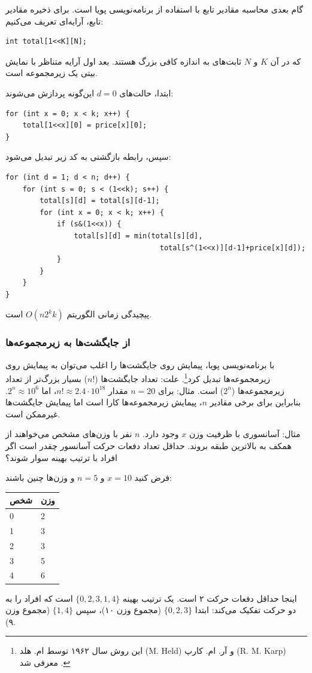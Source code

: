 گام بعدی محاسبه مقادیر تابع با استفاده از برنامه‌نویسی پویا است.
برای ذخیره مقادیر تابع، آرایه‌ای تعریف می‌کنیم:
\begin{lstlisting}
int total[1<<K][N];
\end{lstlisting}
که در آن $K$ و $N$ ثابت‌های به اندازه کافی بزرگ هستند.
بعد اول آرایه متناظر با نمایش بیتی یک زیرمجموعه است.

ابتدا، حالت‌های $d=0$ این‌گونه پردازش می‌شوند:
\begin{lstlisting}
for (int x = 0; x < k; x++) {
    total[1<<x][0] = price[x][0];
}
\end{lstlisting}
سپس، رابطه بازگشتی به کد زیر تبدیل می‌شود:
\begin{lstlisting}
for (int d = 1; d < n; d++) {
    for (int s = 0; s < (1<<k); s++) {
        total[s][d] = total[s][d-1];
        for (int x = 0; x < k; x++) {
            if (s&(1<<x)) {
                total[s][d] = min(total[s][d],
                                    total[s^(1<<x)][d-1]+price[x][d]);
            }
        }
    }
}
\end{lstlisting}
پیچیدگی زمانی الگوریتم $O(n 2^k k)$ است.

\subsubsection{از جایگشت‌ها به زیرمجموعه‌ها}

با برنامه‌نویسی پویا، پیمایش روی جایگشت‌ها را اغلب می‌توان به پیمایش روی زیرمجموعه‌ها تبدیل کرد\footnote{این روش سال ۱۹۶۲ توسط ام. هلد (M. Held) و آر. ام. کارپ (R. M. Karp) معرفی شد \cite{hel62}.}.
علت:
تعداد جایگشت‌ها ($n!$) بسیار بزرگ‌تر از تعداد زیرمجموعه‌ها ($2^n$) است.
مثال: برای $n=20$ مقدار $n! \approx 2.4 \cdot 10^{18}$، اما $2^n \approx 10^6$.
بنابراین برای برخی مقادیر $n$، پیمایش زیرمجموعه‌ها کارا است اما پیمایش جایگشت‌ها غیرممکن است.

مثال:
آسانسوری با ظرفیت وزن $x$ وجود دارد.
$n$ نفر با وزن‌های مشخص می‌خواهند از همکف به بالاترین طبقه بروند.
حداقل تعداد دفعات حرکت آسانسور چقدر است اگر افراد با ترتیب بهینه سوار شوند؟

فرض کنید $x=10$ و $n=5$ و وزن‌ها چنین باشند:
\begin{center}
\begin{tabular}{ll}
شخص & وزن \\
\hline
0 & 2 \\
1 & 3 \\
2 & 3 \\
3 & 5 \\
4 & 6 \\
\end{tabular}
\end{center}
اینجا حداقل دفعات حرکت ۲ است.
یک ترتیب بهینه $\{0,2,3,1,4\}$ است
که افراد را به دو حرکت تفکیک می‌کند:
ابتدا $\{0,2,3\}$ (مجموع وزن ۱۰)،
سپس $\{1,4\}$ (مجموع وزن ۹).

